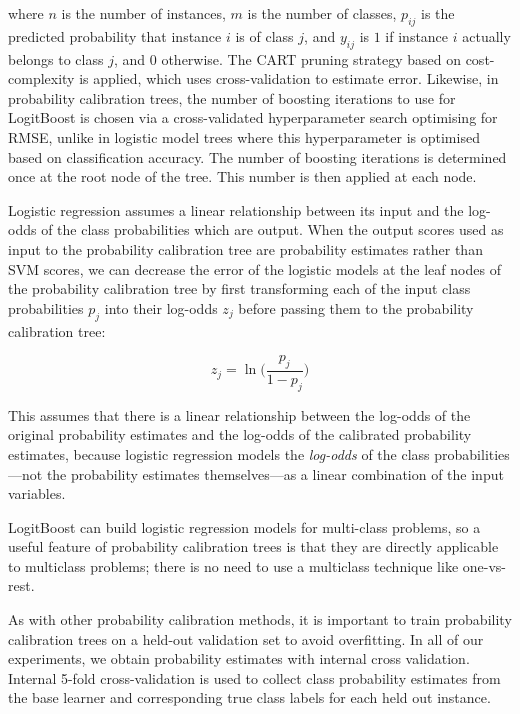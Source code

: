 \documentclass[wcp]{jmlr}
\begin{document}
where $n$ is the number of instances, $m$ is the number of classes, $p_{ij}$ is the predicted probability that instance $i$ is of class $j$, and $y_{ij}$ is $1$ if instance $i$ actually belongs to class $j$, and $0$ otherwise. The CART pruning strategy based on cost-complexity is applied, which uses cross-validation to estimate error. Likewise, in probability calibration trees, the number of boosting iterations to use for LogitBoost is chosen via a cross-validated hyperparameter search optimising for RMSE, unlike in logistic model trees where this hyperparameter is optimised based on classification accuracy. The number of boosting iterations is determined once at the root node of the tree. This number is then applied at each node.

Logistic regression assumes a linear relationship between its input and the log-odds of the class probabilities which are output. When the output scores used as input to the probability calibration tree are probability estimates rather than SVM scores, we can decrease the error of the logistic models at the leaf nodes of the probability calibration tree by first transforming each of the input class probabilities $p_j$ into their log-odds $z_j$ before passing them to the probability calibration tree:

	\begin{equation} \label{eqn:logodds}
		z_j = \ln \bigg( \frac{p_j}{1-p_j} \bigg)
	\end{equation}
	
\noindent This assumes that there is a linear relationship between the log-odds of the original probability estimates and the log-odds of the calibrated probability estimates, because logistic regression models the \textit{log-odds} of the class probabilities---not the probability estimates themselves---as a linear combination of the input variables.

LogitBoost can build logistic regression models for multi-class problems, so a useful feature of probability calibration trees is that they are directly applicable to multiclass problems; there is no need to use a multiclass technique like one-vs-rest.

As with other probability calibration methods, it is important to train probability calibration trees on a held-out validation set to avoid overfitting. In all of our experiments, we obtain probability estimates with internal cross validation. Internal 5-fold cross-validation is used to collect class probability estimates from the base learner and corresponding true class labels for each held out instance.
\end{document}
